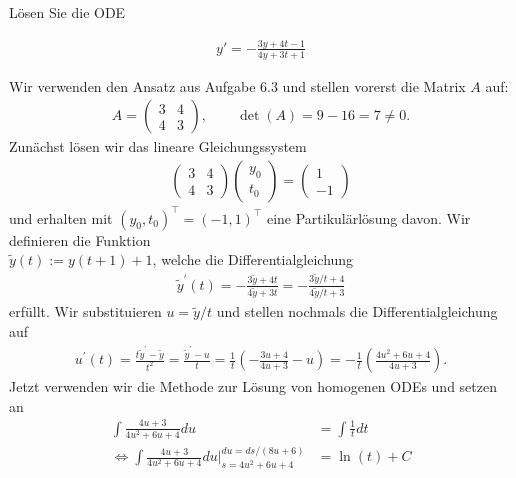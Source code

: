 \begin{exercise}
  Lösen Sie die ODE

  \begin{align*}
    y'= -\frac{3y + 4t - 1}{4y + 3t + 1}
  \end{align*}
\end{exercise}
\begin{solution}
Wir verwenden den Ansatz aus Aufgabe 6.3 und stellen vorerst die Matrix $A$ auf:
\begin{align*}
  A = \begin{pmatrix}
    3 & 4 \\ 4 & 3
  \end{pmatrix}, \qquad \det (A) = 9 - 16 = 7 \neq 0.
\end{align*}
Zunächst lösen wir das lineare Gleichungssystem
\begin{align*}
\begin{pmatrix}
 3 & 4 \\ 4 & 3
\end{pmatrix}
\begin{pmatrix}
  y_0 \\ t_0
\end{pmatrix}
=
\begin{pmatrix}
  1 \\ -1
\end{pmatrix}
\end{align*}
und erhalten mit $(y_0, t_0)^{\top} = (-1,1)^{\top}$ eine Partikulärlösung davon.
Wir definieren die Funktion \\
$\widetilde{y}(t) := y(t + 1) + 1$, welche die Differentialgleichung
\begin{align*}
  \widetilde{y}^{\prime}(t) = -\frac{3\widetilde{y} + 4t}{4\widetilde{y} + 3t}
  = -\frac{3\widetilde{y}/t + 4}{4\widetilde{y}/t + 3}
\end{align*}
erfüllt. Wir substituieren $u = \widetilde{y}/t$ und stellen nochmals die Differentialgleichung auf
\begin{align*}
  u^{\prime}(t) = \frac{t\widetilde{y}^{\prime} - \widetilde{y}}{t^2}
  = \frac{\widetilde{y}^{\prime} - u}{t}
  = \frac{1}{t}\left(-\frac{3u + 4}{4u + 3} -u\right)
  = -\frac{1}{t}\left(\frac{4u^2 + 6u + 4}{4u + 3}\right).
\end{align*}
Jetzt verwenden wir die Methode zur Lösung von homogenen ODEs und setzen an
\begin{align*}
  \int \frac{4u + 3}{4u^2 + 6u + 4} du &= \int \frac{1}{t} dt \\
  \iff \int \frac{4u + 3}{4u^2 + 6u + 4} du \bigg|_{s = 4u^2 + 6u + 4}^{du = ds/(8u + 6)} &= \ln(t) + C \\

\end{align*}
\end{solution}
